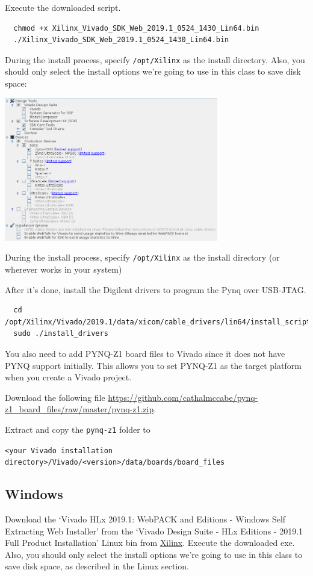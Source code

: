 \documentclass[11pt]{article}
\begin{document}
Execute the downloaded script.

\begin{verbatim}
  chmod +x Xilinx_Vivado_SDK_Web_2019.1_0524_1430_Lin64.bin
  ./Xilinx_Vivado_SDK_Web_2019.1_0524_1430_Lin64.bin
\end{verbatim}

During the install process, specify \texttt{/opt/Xilinx} as the install directory.
Also, you should only select the install options we're going to use in this class to save disk space:

\begin{center}
\includegraphics[width=0.7\textwidth]{figs/vivado_install_options.png}
\end{center}

During the install process, specify \texttt{/opt/Xilinx} as the install directory (or wherever works in your system)

After it's done, install the Digilent drivers to program the Pynq over USB-JTAG.
\begin{verbatim}
  cd /opt/Xilinx/Vivado/2019.1/data/xicom/cable_drivers/lin64/install_script/install_drivers
  sudo ./install_drivers
\end{verbatim}

You also need to add PYNQ-Z1 board files to Vivado since it does not have PYNQ support initially.
This allows you to set PYNQ-Z1 as the target platform when you create a Vivado project.

Download the following file \url{https://github.com/cathalmccabe/pynq-z1_board_files/raw/master/pynq-z1.zip}.

Extract and copy the \verb|pynq-z1| folder to

\texttt{<your Vivado installation directory>/Vivado/<version>/data/boards/board\_files}

\subsection{Windows}
Download the `Vivado HLx 2019.1: WebPACK and Editions - Windows Self Extracting Web Installer' from the `Vivado Design Suite - HLx Editions - 2019.1  Full Product Installation' Linux bin from \href{https://www.xilinx.com/support/download/index.html/content/xilinx/en/downloadNav/vivado-design-tools/archive.html}{Xilinx}.
Execute the downloaded exe.
Also, you should only select the install options we're going to use in this class to save disk space, as described in the Linux section.
\end{document}
